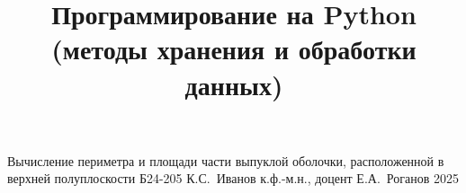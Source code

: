 \documentclass[a4paper,12pt]{memoir}
\begin{document}
\renewcommand{\contentsname}{{\Large{Содержание}\hfill}}

\title{Программирование на Python (методы хранения и обработки данных)}
{Вычисление периметра и площади части выпуклой оболочки, расположенной в верхней полуплоскости}
{Б24-205}
{К.\+С.~Иванов}
{к.ф.-м.н., доцент}
{Е.\+А.~Роганов}
{2025}





\newpage


\end{document}

